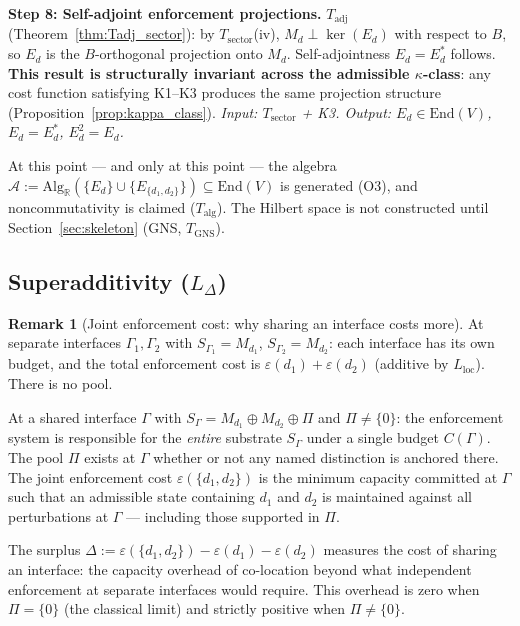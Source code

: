 \documentclass[11pt,a4paper]{article}
\theoremstyle{definition}
\newtheorem{remark}[theorem]{Remark}
\newcommand{\eps}{\varepsilon}
\newcommand{\End}{\mathrm{End}}
\begin{document}
\begin{tcolorbox}[apfbox, title={How the pre-algebraic structure arises from A1+MD+BW (no forward references)}]
\smallskip
\noindent\textbf{Step 8: Self-adjoint enforcement projections.}  $T_{\mathrm{adj}}$ (Theorem~\ref{thm:Tadj_sector}): by $T_{\mathrm{sector}}$(iv), $M_d \perp \ker(E_d)$ with respect to $B$, so $E_d$ is the $B$-orthogonal projection onto $M_d$.  Self-adjointness $E_d = E_d^*$ follows.  \textbf{This result is structurally invariant across the admissible $\kappa$-class}: any cost function satisfying K1--K3 produces the same projection structure (Proposition~\ref{prop:kappa_class}).  \textit{Input: $T_{\mathrm{sector}}$ + K3.  Output: $E_d \in \End(V)$, $E_d = E_d^*$, $E_d^2 = E_d$.}

\smallskip
\noindent At this point --- and only at this point --- the algebra $\mathcal{A} := \mathrm{Alg}_\mathbb{R}(\{E_d\} \cup \{E_{\{d_1,d_2\}}\}) \subseteq \End(V)$ is generated (O3), and noncommutativity is claimed ($T_{\mathrm{alg}}$).  The Hilbert space is not constructed until Section~\ref{sec:skeleton} (GNS, $T_{\mathrm{GNS}}$).
\end{tcolorbox}

\subsection{Superadditivity ($L_\Delta$)}

\begin{remark}[Joint enforcement cost: why sharing an interface costs more]\label{rem:joint_cost}
At separate interfaces $\Gamma_1, \Gamma_2$ with $S_{\Gamma_1} = M_{d_1}$, $S_{\Gamma_2} = M_{d_2}$: each interface has its own budget, and the total enforcement cost is $\eps(d_1) + \eps(d_2)$ (additive by $L_{\mathrm{loc}}$).  There is no pool.

At a shared interface $\Gamma$ with $S_\Gamma = M_{d_1} \oplus M_{d_2} \oplus \Pi$ and $\Pi \ne \{0\}$: the enforcement system is responsible for the \emph{entire} substrate $S_\Gamma$ under a single budget $C(\Gamma)$.  The pool $\Pi$ exists at $\Gamma$ whether or not any named distinction is anchored there.  The joint enforcement cost $\eps(\{d_1, d_2\})$ is the minimum capacity committed at $\Gamma$ such that an admissible state containing $d_1$ and $d_2$ is maintained against all perturbations at $\Gamma$ --- including those supported in $\Pi$.

The surplus $\Delta := \eps(\{d_1,d_2\}) - \eps(d_1) - \eps(d_2)$ measures the cost of sharing an interface: the capacity overhead of co-location beyond what independent enforcement at separate interfaces would require.  This overhead is zero when $\Pi = \{0\}$ (the classical limit) and strictly positive when $\Pi \ne \{0\}$.
\end{remark}
\end{document}
